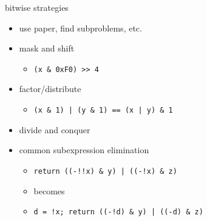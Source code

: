 \begin{frame}[fragile,label=bitStrat]{bitwise strategies}
    \begin{itemize}
        \item use paper, find subproblems, etc.
        \item mask and shift 
            \begin{itemize}
                \item \lstinline+(x & 0xF0) >> 4+
            \end{itemize}
        \item factor/distribute
            \begin{itemize}
                \item \lstinline+(x & 1) | (y & 1) == (x | y) & 1+
            \end{itemize}
        \item divide and conquer
        \item common subexpression elimination
            \begin{itemize}
                \item \lstinline+return ((-!!x) & y) | ((-!x) & z)+
                \item becomes
                \item \lstinline+d = !x; return ((-!d) & y) | ((-d) & z)+
            \end{itemize}
    \end{itemize}
\end{frame}
